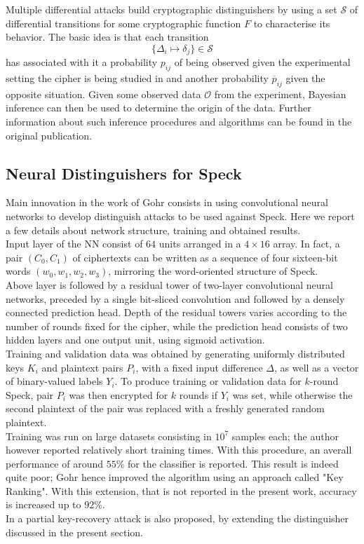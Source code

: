 \documentclass[%
    corpo=11pt,
    twoside,
    stile=classica,
    oldstyle,
    autoretitolo,
    tipotesi=magistrale,
    greek,
    evenboxes,
    english
]{toptesi}
\begin{document}
Multiple differential attacks build cryptographic distinguishers by using a set $\mathcal{S}$ of differential transitions for some cryptographic function $F$ to characterise its behavior. The basic idea is that each transition 
\begin{equation}
\{\Delta_i \mapsto \delta_j\} \in \mathcal{S}
\end{equation} 
has associated with it a probability $p_{ij}$ of being observed given the experimental setting the cipher is being studied in and another probability $\overline{p}_{ij}$ given the opposite situation. Given some observed data $\mathcal{O}$ from the experiment, Bayesian inference can then be used to determine the origin of the data. Further information about such inference procedures and algorithms can be found in the original publication.
\subsection{Neural Distinguishers for Speck}
Main innovation in the work of Gohr consists in using convolutional neural networks to develop distinguish attacks to be used against Speck. Here we report a few details about network structure, training and obtained results. \\
Input layer of the NN consist of $64$ units arranged in a $4\times16$ array. In fact, a pair $(C_0,C_1)$ of ciphertexts can be written as a sequence of four sixteen-bit words $(w_0,w_1,w_2,w_3)$, mirroring the word-oriented structure of Speck. \\
Above layer is followed by a residual tower of two-layer convolutional neural networks, preceded by a single bit-sliced convolution and followed by a densely connected prediction head. Depth of the residual towers varies according to the number of rounds fixed for the cipher, while the prediction head consists of two hidden layers and one output unit, using sigmoid activation. \\
Training and validation data was obtained by generating uniformly distributed keys $K_i$ and plaintext pairs $P_i$, with a fixed input difference $\Delta$, as well as a vector of binary-valued labels $Y_i$. To produce training or validation data for $k$-round Speck, pair $P_i$ was then encrypted for $k$ rounds if $Y_i$ was set, while otherwise the second plaintext of the pair was replaced with a freshly generated random plaintext. \\
Training was run on large datasets consisting in $10^7$ samples each; the author however reported relatively short training times. With this procedure, an averall performance of around $55\%$ for the classifier is reported. This result is indeed quite poor; Gohr hence improved the algorithm using an approach called "Key Ranking". With this extension, that is not reported in the present work, accuracy is increased up to $92\%$. \\
In \cite{gohr} a partial key-recovery attack is also proposed, by extending the distinguisher discussed in the present section. 
\end{document}
